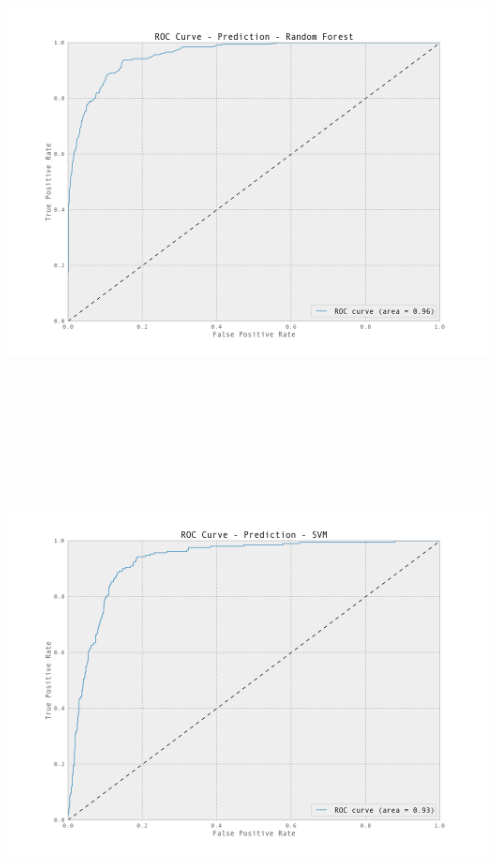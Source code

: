 \documentclass[12pt, letterpaper]{article}
\begin{document}
\begin{center}
\includegraphics[height=5in, width=5in]{roc_plot_Prediction_RandomForest.png}
\end{center}

\begin{center}
\includegraphics[height=5in, width=5in]{roc_plot_Prediction_SVM.png}
\end{center}
\end{document}
